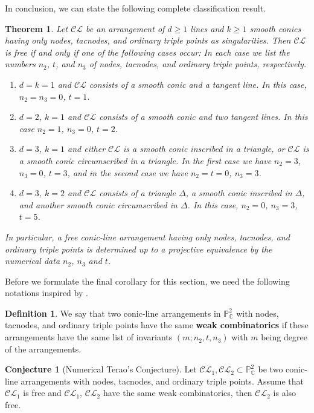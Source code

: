 \documentclass[12pt]{amsart}
\theoremstyle{plain}
\newtheorem{thm}[subsection]{Theorem}
\theoremstyle{definition}
\newtheorem{definition}[subsection]{Definition}
\newtheorem{conj}[subsection]{Conjecture}
\numberwithin{equation}{section}
\begin{document}
In conclusion, we can state the following complete classification result.
\begin{thm}
\label{thm11}
Let $\mathcal{CL}$ be an arrangement of $d \geq 1$ lines and $k \geq 1$ smooth conics having only nodes, tacnodes, and  ordinary triple points as singularities. Then  $\mathcal{CL}$ is free if and only if one of the following cases occur:
In each case we list the numbers $n_2$, $t$, and $n_3$ of nodes, tacnodes, and ordinary triple points, respectively.
\begin{enumerate}

\item $d=k=1$ and $\mathcal{CL}$ consists of a smooth conic and a tangent line.
In this case, $n_2=n_3=0$, $t=1$.

\item $d=2$, $k=1$ and $\mathcal{CL}$ consists of a smooth conic and two tangent lines. In this case $n_2=1$, $n_3=0$, $t=2$.

\item $d=3$, $k=1$ and either $\mathcal{CL}$ is a smooth conic inscribed in a triangle, or $\mathcal{CL}$ is a smooth conic circumscribed in a triangle.
In the first case we have $n_2=3$, $n_3=0$, $t=3$, and in the second case we have $n_2=t=0$, $n_3=3$. 

\item $d=3$, $k=2$ and $\mathcal{CL}$ consists of a triangle $\Delta$, a smooth conic inscribed in $\Delta$, and another smooth conic circumscribed in $\Delta$. In this case, $n_2=0$, $n_3=3$, $t=5$.

\end{enumerate}
In particular, a free conic-line arrangement having only nodes, tacnodes, and ordinary triple points is determined up to a projective equivalence by the numerical data $n_2$, $n_3$ and $t$.
\end{thm}
Before we formulate the final corollary for this section, we need the following notations inspired by \cite{Mar}.
\begin{definition}
We say that two conic-line arrangements in $\mathbb{P}^{2}_{\mathbb{C}}$ with nodes, tacnodes, and ordinary triple points have the same \textbf{weak combinatorics} if these arrangements have the same list of invariants $(m; n_{2}, t, n_{3})$ with $m$ being degree of the arrangements.
\end{definition}
\begin{conj}[Numerical Terao's Conjecture]
Let $\mathcal{CL}_{1}, \mathcal{CL}_{2} \subset \mathbb{P}^{2}_{\mathbb{C}}$ be two conic-line arrangements with nodes, tacnodes, and ordinary triple points. Assume that $\mathcal{CL}_{1}$ is free and  $\mathcal{CL}_{1}$, $\mathcal{CL}_{2}$ have the same weak combinatorics, then $\mathcal{CL}_{2}$ is also free.
\end{conj}
\end{document}
